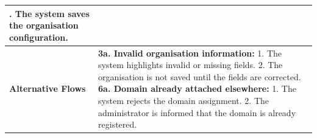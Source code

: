 \begin{longtable}{|>{\raggedright\arraybackslash}p{}|>{\raggedright\arraybackslash}p{}|}
8. The system saves the organisation configuration. \\ \hline
\textbf{Alternative Flows} &
\textbf{3a. Invalid organisation information:} \newline
\hspace*{1em}1. The system highlights invalid or missing fields. \newline
\hspace*{1em}2. The organisation is not saved until the fields are corrected. \newline
\textbf{6a. Domain already attached elsewhere:} \newline
\hspace*{1em}1. The system rejects the domain assignment. \newline
\hspace*{1em}2. The administrator is informed that the domain is already registered. \\
\end{longtable}

